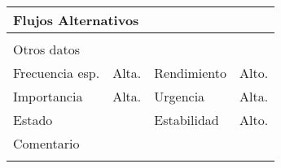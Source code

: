 \documentclass{article}
\begin{document}
\begin{table}[h]
\begin{tabular}{|l|l|l|l|l|l|}
\hline
\multicolumn{6}{|p{10cm}|}{Flujos Alternativos}\\
\hline
\multicolumn{1}{|p{1cm}}{} & \multicolumn{5}{|p{9cm}|}{}\\
\hline
\multicolumn{6}{|p{10cm}|}{Otros datos}\\
\hline
\multicolumn{1}{|p{2cm}|}{Frecuencia esp.} & \multicolumn{2}{p{3cm}}{Alta.} & \multicolumn{1}{|p{2cm}|}{Rendimiento} & \multicolumn{2}{p{3cm}|}{Alto.}\\
\hline
\multicolumn{1}{|p{2cm}|}{Importancia} & \multicolumn{2}{p{3cm}}{Alta.} & \multicolumn{1}{|p{2cm}|}{Urgencia} & \multicolumn{2}{p{3cm}|}{Alta.}\\
\hline
\multicolumn{1}{|p{2cm}|}{Estado} & \multicolumn{2}{p{3cm}}{} & \multicolumn{1}{|p{2cm}|}{Estabilidad} & \multicolumn{2}{p{3cm}|}{Alto.}\\
\hline
\multicolumn{6}{|p{10cm}|}{Comentario}\\
\hline
\multicolumn{6}{|p{10cm}|}{}\\
\hline
\end{tabular}
\end{table}
\end{document}
